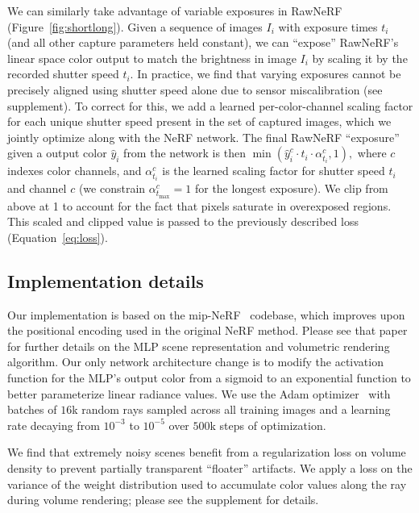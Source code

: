 We can similarly take advantage of variable exposures in RawNeRF (Figure~\ref{fig:shortlong}). Given a sequence of images $I_i$ with exposure times $t_i$ (and all other capture parameters held constant), we can
``expose'' RawNeRF's linear space color output to match the brightness in image $I_i$ by scaling it by the recorded shutter speed $t_i$.
In practice, we find that varying exposures cannot be precisely aligned using shutter speed alone due to sensor miscalibration (see supplement). 
To correct for this, we add a learned per-color-channel scaling factor for each unique shutter speed present in the set of captured images, which we jointly optimize along with the NeRF network. The final RawNeRF ``exposure'' given a output color $\hat y_i$ from the network is then
$
    \min(\hat y_i^c \cdot t_i \cdot \alpha_{t_i}^c, 1),
$
where $c$ indexes color channels, and $\alpha_{t_i}^c$ is the learned scaling factor for shutter speed $t_i$ and channel $c$ (we constrain $\alpha_{t_\textrm{max}}^c=1$ for the longest exposure).
We clip from above at 1 to account for the fact that pixels saturate in overexposed regions. 
This scaled and clipped value is passed to the previously described loss (Equation~\ref{eq:loss}).




\subsection{Implementation details}

Our implementation is based on the mip-NeRF~\cite{barron2021} codebase, which improves upon the positional encoding used in the original NeRF method. Please see that paper for further details on the MLP scene representation and volumetric rendering algorithm. 
Our only network architecture change is to modify the activation function for the MLP's output color from a sigmoid to an exponential function to better parameterize linear radiance values. We use the Adam optimizer~\cite{adam} with batches of $16$k random rays sampled across all training images and a learning rate decaying from $10^{-3}$ to $10^{-5}$ over $500$k steps of optimization.

We find that extremely noisy scenes benefit from a regularization loss on volume density to prevent partially transparent ``floater'' artifacts. We apply a loss on the variance of the weight distribution used to accumulate color values along the ray during volume rendering; please see the supplement for details.

